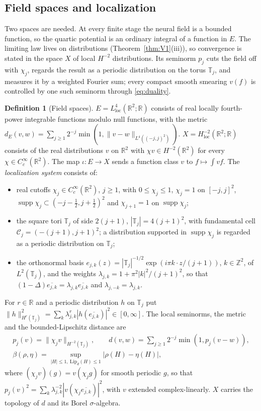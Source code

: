 \documentclass[11pt]{article}
\theoremstyle{plain}
\theoremstyle{definition}
\newtheorem{definition}[theorem]{Definition}
\theoremstyle{remark}
\newcommand{\R}{\mathbb{R}}
\newcommand{\Z}{\mathbb{Z}}
\newcommand{\T}{\mathbb{T}}
\newcommand{\cC}{\mathcal{C}}
\newcommand{\Hloc}{H^{-2}_{\mathrm{loc}}(\R^2;\R)}
\newcommand{\Lfour}{L^{4}_{\mathrm{loc}}(\R^2;\R)}
\newcommand{\conj}[1]{\overline{#1}}
\DeclareMathOperator{\supp}{supp}
\begin{document}
\subsection{Field spaces and localization}\label{sec:fieldspace-def}

Two spaces are needed. At every finite stage the neural field is a bounded function, so the quartic potential is an ordinary integral of a function in $E$. The limiting law lives on distributions (Theorem~\ref{thm:V1}(iii)), so convergence is stated in the space $X$ of local $H^{-2}$ distributions. Its seminorm $p_j$ cuts the field off with $\chi_j$, regards the result as a periodic distribution on the torus $\T_j$, and measures it by a weighted Fourier sum; every compact smooth smearing $v(f)$ is controlled by one such seminorm through \eqref{eq:duality}.

\begin{definition}[Field spaces]\label{def:fieldspace}
$E=\Lfour$ consists of real locally fourth-power integrable functions modulo
null functions, with the metric
$d_E(v,w)=\sum_{j\ge1}2^{-j}\min(1,\|v-w\|_{L^{4}((-j,j)^{2})})$.
$X=\Hloc$ consists of the real distributions $v$ on $\R^{2}$ with
$\chi v\in H^{-2}(\R^{2})$ for every $\chi\in C_c^{\infty}(\R^{2})$. The map
$\iota:E\to X$ sends a function class $v$ to $f\mapsto\int vf$. The
\emph{localization system} consists of:
\begin{itemize}
\item real cutoffs $\chi_j\in C_c^{\infty}(\R^{2})$, $j\ge1$, with
  $0\le\chi_j\le1$, $\chi_j=1$ on $[-j,j]^{2}$,
  $\supp\chi_j\subset(-j-\tfrac12,j+\tfrac12)^{2}$ and $\chi_{j+1}=1$ on
  $\supp\chi_j$;
\item the square tori $\T_j$ of side $2(j+1)$, $|\T_j|=4(j+1)^{2}$, with
  fundamental cell $\cC_j=(-(j+1),j+1)^{2}$; a distribution supported in
  $\supp\chi_j$ is regarded as a periodic distribution on $\T_j$;
\item the orthonormal basis $e_{j,k}(z)=|\T_j|^{-1/2}\exp(i\pi k\cdot z/(j+1))$,
  $k\in\Z^{2}$, of $L^{2}(\T_j)$, and the weights
  $\lambda_{j,k}=1+\pi^{2}|k|^{2}/(j+1)^{2}$, so that
  $(1-\Delta)\conj{e_{j,k}}=\lambda_{j,k}\conj{e_{j,k}}$ and
  $\lambda_{j,-k}=\lambda_{j,k}$.
\end{itemize}
For $r\in\R$ and a periodic distribution $h$ on $\T_j$ put
$\|h\|_{H^{r}(\T_j)}^{2}=\sum_{k}\lambda_{j,k}^{r}|h(\conj{e_{j,k}})|^{2}\in[0,\infty]$.
The local seminorms, the metric and the bounded-Lipschitz distance are
\begin{equation}\label{eq:metric}
\begin{gathered}
p_j(v)=\|\chi_j v\|_{H^{-2}(\T_j)},\qquad
d(v,w)=\sum_{j\ge1}2^{-j}\min(1,p_j(v-w)),\\
\beta(\rho,\eta)=\sup_{|H|\le1,\ \mathrm{Lip}_d(H)\le1}|\rho(H)-\eta(H)|,
\end{gathered}
\end{equation}
where $(\chi_jv)(g)=v(\chi_jg)$ for smooth periodic $g$, so that
$p_j(v)^{2}=\sum_k\lambda_{j,k}^{-2}|v(\chi_j\conj{e_{j,k}})|^{2}$, with $v$
extended complex-linearly. $X$ carries the topology of $d$ and its Borel
$\sigma$-algebra.
\end{definition}
\end{document}
